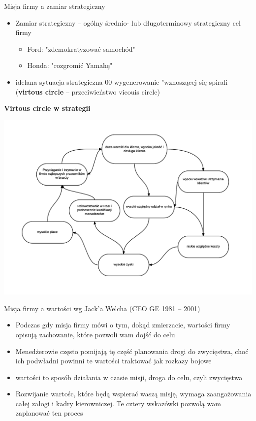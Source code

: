 \documentclass[a4paper,10pt]{report}
\begin{document}
Misja firmy a zamiar strategiczny
\begin{itemize}
	\item Zamiar strategiczny -- ogólny średnio- lub długoterminowy strategiczny cel firmy
	\begin{itemize}
		\item Ford: "zdemokratyzować samochód"
		\item Honda: "rozgromić Yamahę"
	\end{itemize}
	\item idelana sytuacja strategiczna 00 wygenerowanie "wznoszącej się spirali (\textbf{virtous circle} -- przeciwieństwo vicouis circle)
\end{itemize}

\textbf{Virtous circle w strategii}
\begin{center}
\includegraphics[scale=0.7]{assets/circle}
\end{center}

Misja firmy a wartości wg Jack'a Welcha (CEO GE 1981 -- 2001)
\begin{itemize}
	\item Podczas gdy misja firmy mówi o tym, dokąd zmierzacie, wartości firmy opisują zachowanie, które pozwoli wam dojść do celu
	\item Menedżerowie często pomijają tę część planowania drogi do zwycięstwa, choć ich podwładni powinni te wartości traktować jak rozkazy bojowe
	\item wartości to sposób działania w czasie misji, droga do celu, czyli zwycięstwa
	\item Rozwijanie wartośc, które będą wspierać waszą misję, wymaga zaangażowania całej załogi i kadry kierowniczej. Te cztery wskazówki pozwolą wam zaplanować ten proces
\end{itemize}
\end{document}
